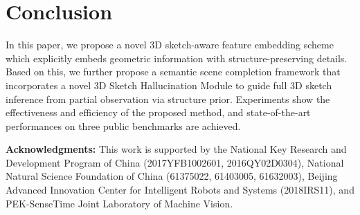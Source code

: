 \documentclass[10pt,twocolumn,letterpaper]{article}
\begin{document}
\section{Conclusion}
In this paper, we propose a novel 3D sketch-aware feature embedding scheme which explicitly embeds geometric information with structure-preserving details. Based on this, we further propose a semantic scene completion framework that incorporates a novel 3D Sketch Hallucination Module to guide full 3D sketch inference from partial observation via structure prior. Experiments show the effectiveness and efficiency of the proposed method, and state-of-the-art performances on three public benchmarks are achieved.

\quad

\noindent \textbf{Acknowledgments:} This work is supported by the National Key Research and Development Program of China (2017YFB1002601, 2016QY02D0304), National Natural Science Foundation of China (61375022, 61403005, 61632003), Beijing Advanced Innovation Center for Intelligent Robots and Systems (2018IRS11), and PEK-SenseTime Joint Laboratory of Machine Vision.


{\small


}
\end{document}
